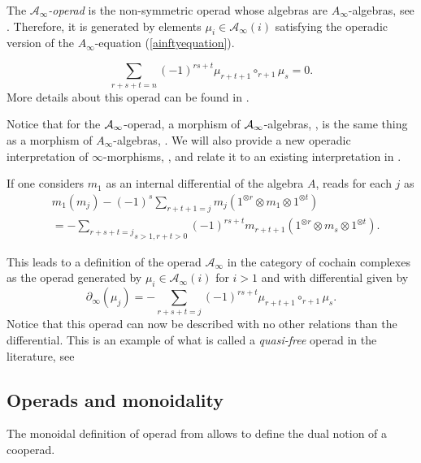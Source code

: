 \documentclass[Thesis.tex]{subfiles}
\begin{document}
\begin{defin}
The \emph{$\mathcal{A}_\infty$-operad} is the non-symmetric operad whose algebras are $A_\infty$-algebras, see . Therefore, it is generated by elements $\mu_i\in\mathcal{A}_\infty(i)$ satisfying the operadic version of the $A_\infty$-equation (\ref{ainftyequation}).

\begin{equation}\label{operadicainftyequation}
\sum_{r+s+t=n}(-1)^{rs+t}\mu_{r+t+1}\circ_{r+1}\mu_s=0.
\end{equation}
More details about this operad can be found in \cite[Chapter 9]{lodayvallette}.
\end{defin}

Notice that for the $\mathcal{A}_\infty$-operad, a morphism of $\mathcal{A}_\infty$-algebras, , is the same thing as a morphism of $A_\infty$-algebras, . We will also provide a new operadic interpretation of $\infty$-morphisms, , and relate it to an existing interpretation in . 

\begin{remark}
If one considers $m_1$ as an internal differential of the algebra $A$,  reads for each $j$ as
\begin{align*}
&m_1(m_j) -(-1)^s \sum _{r+t+1 = j}m_j(1^{\otimes r}\otimes m_1\otimes 1^{\otimes t})\\
&=-\underset{s>1, r+t >0}{\sum_{r+s+t=j}}(-1)^{rs+t}m_{r+t+1}(1^{\otimes r}\otimes m_s\otimes 1^{\otimes t}).
\end{align*}

This leads to a definition of the operad $\mathcal{A}_\infty$ in the category of cochain complexes as the operad generated by $\mu_i\in\mathcal{A}_\infty(i)$ for $i>1$ and with differential given by
\[
\partial_\infty(\mu_j)= -{\sum_{r+s+t=j}}(-1)^{rs+t}\mu_{r+t+1}\circ_{r+1} \mu_s.
\]
Notice that this operad can now be described with no other relations than the differential. This is an example of what is called a \emph{quasi-free} operad in the literature, see \cite[\S 6.3.3]{lodayvallette}
\end{remark}



\subsection{Operads and monoidality}

The monoidal definition of operad from  allows to define the dual notion of a cooperad.
\end{document}
